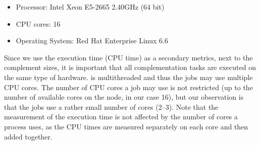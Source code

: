 \begin{itemize}
\item Processor: Intel Xeon E5-2665 2.40GHz (64 bit)
\item CPU cores: 16
\item Operating System: Red Hat Enterprise Linux 6.6
\end{itemize}

Since we use the execution time (CPU time) as a secondary metrics, next to the complement sizes, it is important that all complementation tasks are executed on the same type of hardware. \goal{} is multithreaded and thus the jobs may use multiple CPU cores. The number of CPU cores a job may use is not restricted (up to the number of available cores on the node, in our case 16), but our observation is that the jobs use a rather small number of cores (2--3). Note that the measurement of the execution time is not affected by the number of cores a process uses, as the CPU times are measured separately on each core and then added together.  





